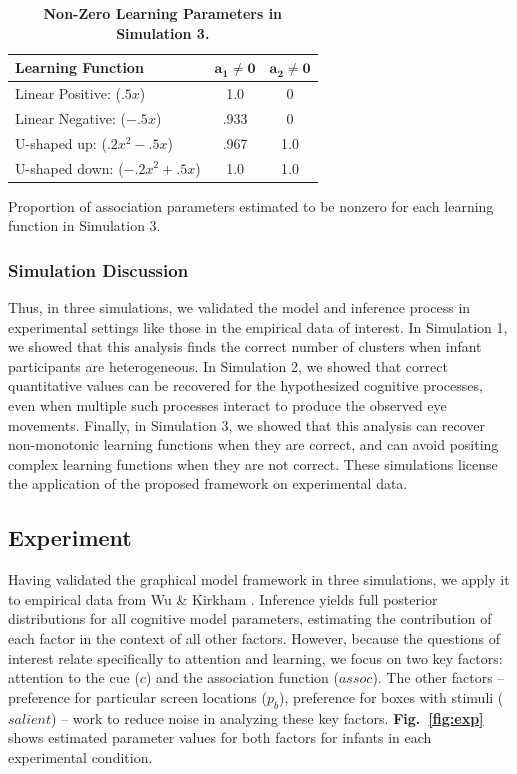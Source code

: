 \documentclass[12pt]{article}
\begin{document}
\begin{table}[!ht]
	\caption{\textbf{Non-Zero Learning Parameters in Simulation 3.}}
	\center
	\begin{tabular}{l c c}
	\hline
	\textbf{Learning Function} & $\mathbf{a_{1} \neq 0}$ & $\mathbf{a_{2} \neq 0}$\\
	\hline
	Linear Positive: ($.5x$) & 1.0 & 0\\
	Linear Negative: ($-.5x$) & .933 & 0\\
	U-shaped up: ($.2x^{2}-.5x$) & .967 & 1.0\\
	U-shaped down: ($-.2x^{2} + .5x$) & 1.0 & 1.0\\
	\hline
\end{tabular}
\begin{flushleft} Proportion of association parameters estimated to be nonzero for each learning function in Simulation 3.
\end{flushleft}
\label{tab:type_errs}
\end{table}

\subsubsection*{Simulation Discussion} 

	Thus, in three simulations, we validated the model and inference process in experimental settings like those in the empirical data of interest. In Simulation 1, we showed that this analysis finds the correct number of clusters when infant participants are heterogeneous. In Simulation 2, we showed that correct quantitative values can be recovered for the hypothesized cognitive processes, even when multiple such processes interact to produce the observed eye movements. Finally, in Simulation 3, we showed that this analysis can recover non-monotonic learning functions when they are correct, and can avoid positing complex learning functions when they are not correct. These simulations license the application of the proposed framework on experimental data.

\subsection*{Experiment}

	Having validated the graphical model framework in three simulations, we apply it to empirical data from Wu \& Kirkham \cite{Wu2010a}. Inference yields full posterior distributions for all cognitive model parameters, estimating the contribution of each factor in the context of all other factors. However, because the questions of interest relate specifically to attention and learning, we focus on two key factors: attention to the cue ($c$) and the association function ($assoc$). The other factors -- preference for particular screen locations ($p_{b}$), preference for boxes with stimuli ($salient$) -- work to reduce noise in analyzing these key factors. \textbf{Fig.~\ref{fig:exp}} shows estimated parameter values for both factors for infants in each experimental condition.
\end{document}
